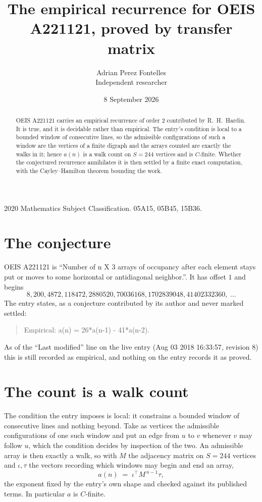 \documentclass[11pt,a4paper]{article}
\title{The empirical recurrence for OEIS A221121, proved by transfer matrix}
\author{Adrian Perez Fontelles\\ \small Independent researcher}
\date{8 September 2026}
\theoremstyle{plain}
\theoremstyle{definition}
\begin{document}
\maketitle

\begin{abstract}
OEIS A221121 carries an empirical recurrence of order $2$ contributed by R.~H.~Hardin. It is
true, and it is decidable rather than empirical. The entry's condition is local to a bounded window of consecutive lines, so
the admissible configurations of such a window are the vertices of a finite digraph and the
arrays counted are exactly the walks in it; hence $a(n)$ is a walk count on $S=244$ vertices
and is $C$-finite. Whether the conjectured recurrence annihilates it is then settled by a
finite exact computation, with the Cayley--Hamilton theorem bounding the work.
\end{abstract}

\noindent\small 2020 Mathematics Subject Classification. 05A15, 05B45, 15B36.\normalsize

\section{The conjecture}

OEIS A221121 is ``Number of n X 3 arrays of occupancy after each element stays put or moves to some horizontal or antidiagonal neighbor.''. It has offset $1$ and begins
\[
8, 200, 4872, 118472, 2880520, 70036168, 1702839048, 41402332360,\ \dots
\]
The entry states, as a conjecture contributed by its author and never marked settled:
\begin{quote}
Empirical: a(n) = 26*a(n-1) - 41*a(n-2).
\end{quote}
As of the ``Last modified'' line on the live entry (Aug 03 2018 16:33:57, revision 8) this is still
recorded as empirical, and nothing on the entry records it as proved.

\section{The count is a walk count}

The condition the entry imposes is local: it constrains a bounded window of consecutive lines and nothing beyond. Take as
vertices the admissible configurations of one such window and put an edge from $u$ to $v$
whenever $v$ may follow $u$, which the condition decides by inspection of the two. An
admissible array is then exactly a walk, so with $M$ the adjacency matrix on $S=244$ vertices
and $\iota,\tau$ the vectors recording which windows may begin and end an array,
\[
a(n)\;=\;\iota^{\!\top}M^{\,n-1}\tau ,
\]
the exponent fixed by the entry's own shape and checked against its published terms. In
particular $a$ is $C$-finite.
\end{document}
